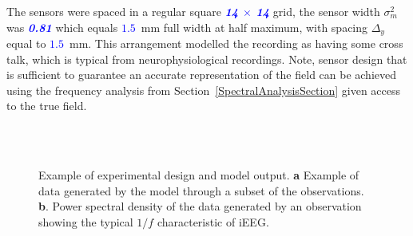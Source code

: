 \documentclass[twocolumn,11pt,a4paper]{article}		%
\newcommand{\parham}[1]{\textsf{\emph{\textbf{\textcolor{blue}{#1}}}}}
\begin{document}
The sensors were spaced in a regular square \parham{14 $\times$ 14} grid, the sensor width $\sigma^2_m$ was \parham{0.81} which equals \parham{$1.5$}~mm full width at half maximum, with spacing $\Delta_y$ equal to \parham{$1.5$}~mm. This arrangement modelled the recording as having some cross talk, which is typical from neurophysiological recordings. Note, sensor design that is sufficient to guarantee an accurate representation of the field can be achieved using the frequency analysis from Section~\ref{SpectralAnalysisSection} given access to the true field. 
\begin{figure}[th]\label{fig:experimental design}
   	\begin{center}
   		 \\
   		 \\
   	\end{center}
   	\caption{Example of experimental design and model output.  \textbf{a} Example of data generated by the model through a subset of the observations. \textbf{b}. Power spectral density of the data generated by an observation showing the typical $1/f$ characteristic of iEEG.} 
   \end{figure}
\end{document}
